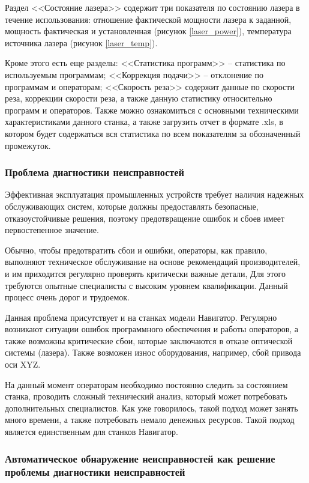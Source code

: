 Раздел <<Состояние лазера>> содержит три показателя по
состоянию лазера в течение использования:
отношение фактической мощности лазера к заданной,
мощность фактическая и установленная (рисунок \ref{laser_power}), температура источника лазера (рисунок \ref{laser_temp}).

Кроме этого есть еще разделы:
<<Статистика программ>> -- статистика по используемым программам;
<<Коррекция подачи>> -- отклонение по программам и операторам;
<<Скорость реза>> содержит данные по скорости реза,
коррекции скорости реза, а также данную статистику относительно программ и операторов.
Также можно ознакомиться с основными техническими характеристиками данного станка,
а также загрузить отчет в формате .xls, в котором будет содержаться вся статистика
по всем показателям за обозначенный промежуток.

\subsubsection{Проблема диагностики неисправностей}

Эффективная эксплуатация промышленных устройств
требует наличия надежных обслуживающих систем,
которые должны предоставлять безопасные, отказоустойчивые решения,
поэтому предотвращение ошибок и сбоев имеет первостепенное значение.

Обычно, чтобы предотвратить сбои и ошибки, операторы,
как правило, выполняют техническое обслуживание 
на основе рекомендаций производителей, 
и им приходится регулярно проверять критически важные детали,
Для этого требуются опытные специалисты с высоким уровнем квалификации.
Данный процесс очень дорог и трудоемок.

Данная проблема присутствует и на станках модели Навигатор.
Регулярно возникают ситуации ошибок программного обеспечения
и работы операторов, а также возможны критические сбои,
которые заключаются в отказе оптической системы (лазера).
Также возможен износ оборудования,
например, сбой привода оси XYZ.

На данный момент операторам необходимо постоянно следить за состоянием
станка, проводить сложный технический анализ,
который может потребовать дополнительных специалистов.
Как уже говорилось, такой подход может занять много времени,
а также потребовать немало денежных ресурсов.
Такой подход является единственным для станков Навигатор.


\subsubsection{Автоматическое обнаружение неисправностей как решение проблемы диагностики неисправностей}

